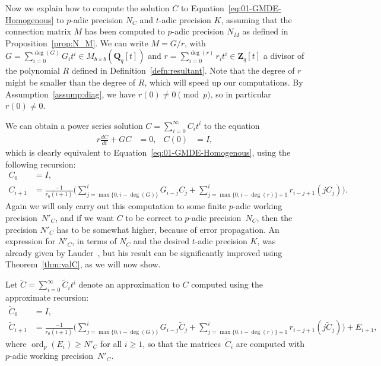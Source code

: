 \documentclass[a4paper,11pt]{article}
\numberwithin{equation}{section}
\newcommand{\ZZ}{\mathbf{Z}} %
\newcommand{\QQ}{\mathbf{Q}} %
\DeclareMathOperator{\ord}{ord}          %
\theoremstyle{definition}
\begin{document}
Now we explain how to compute the solution $C$ to Equation~\eqref{eq:01-GMDE-Homogenous} 
to $p$-adic precision $N_C$ and $t$-adic precision $K$, assuming that the connection 
matrix $M$ has been computed to $p$-adic precision $N_M$ as defined in 
Proposition~\ref{prop:N_M}. We can write $M = G/r$, with 
$G = \sum_{i=0}^{\deg(G)} G_i t^i \in M_{b \times b}(\QQ_q[t])$ 
and $r = \sum_{i=0}^{\deg(r)} r_i t^i \in \ZZ_q[t]$ a divisor of the polynomial $R$ defined in 
Definition~\ref{defn:resultant}. 
Note that the degree of $r$ might be smaller than the degree 
of $R$, which will speed up our computations. By Assumption~\ref{assump:diag}, we have
$r(0) \neq 0 \pmod{p}$, so in particular $r(0) \neq 0$.  

We can obtain a power series solution $C = \sum_{i=0}^{\infty} C_i t^i$ to
the equation
\begin{align*}
r \frac{dC}{dt} + G C &= 0, &C(0)& = I,
\end{align*}
which is clearly equivalent to 
Equation~\eqref{eq:01-GMDE-Homogenous}, using the following recursion:  
\begin{align} \label{eq:recursiondifeq}
C_0 &= I, \nonumber \\
C_{i+1} &= \frac{-1}{r_0 (i+1)} \biggl(
    \sum_{j=\max{\{0,i-\deg(G)\}}}^i G_{i-j} C_j + 
    \sum_{j=\max{\{0,i-\deg(r)\}}+1}^i r_{i-j+1} (j C_j) \biggr).
\end{align}
Again we will only carry out this computation to some finite $p$-adic 
working precision~$N'_C$, and if we want $C$ to be correct to $p$-adic 
precision~$N_C$, then the precision $N'_C$ has to be somewhat higher, 
because of error propagation. An expression for $N'_C$, in terms of 
$N_C$ and the desired $t$-adic precision $K$, was already given by 
Lauder~\citep[Theorem~5.1]{Lauder2006}, but his result can be
significantly improved using Theorem~\ref{thm:valC}, as we will now show. 

Let $\tilde{C}=\sum_{i=0}^{\infty} \tilde{C}_i t^i$ denote an 
approximation to $C$ computed using the approximate recursion:  
\begin{align*}
\tilde{C}_0 &= I, \\
\tilde{C}_{i+1} &= \frac{-1}{r_0 (i+1)} \biggl(
    \sum_{j=\max{\{0,i-\deg({G})\}}}^i {G}_{i-j} \tilde{C}_j + 
    \sum_{j=\max{\{0,i-\deg({r})\}}+1}^i {r}_{i-j+1} (j \tilde{C}_j) \biggr) + {E}_{i+1},
\end{align*}
where $\ord_p({E}_i) \geq N'_{C}$ for all $i \geq 1$, 
so that the matrices~$\tilde{C}_i$ are computed with $p$-adic working 
precision~$N'_C$.
\end{document}
